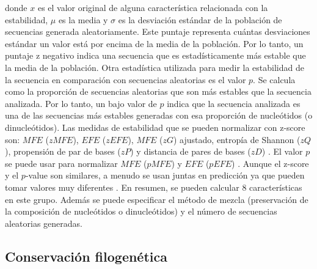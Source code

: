 \noindent donde $x$ es el valor original de alguna característica relacionada con la estabilidad, $\mu$ es la media y $\sigma$ es la desviación estándar de la
población de secuencias generada aleatoriamente. Este puntaje representa cuántas desviaciones estándar un valor está por encima de la media de la población. Por
lo tanto, un puntaje z negativo indica una secuencia que es estadísticamente más estable que la media de la población. Otra estadística utilizada para medir la
estabilidad de la secuencia en comparación con secuencias aleatorias es el valor $p$. Se calcula como la proporción de secuencias aleatorias que son más
estables que la secuencia analizada. Por lo tanto, un bajo valor de $p$ indica que la secuencia analizada es una de las secuencias más estables generadas con
esa proporción de nucleótidos (o dinucleótidos). Las medidas de estabilidad que se pueden normalizar con z-score son: $ MFE $ ($ zMFE $), $ EFE $ ($ zEFE $), $
MFE $ ($ zG $) ajustado, entropía de Shannon ($ zQ $), propensión de par de bases ($ zP $) \citep{ng2007novo} y distancia de pares de bases ($ zD $)
\citep{ding2010mirensvm}. El valor $p$ se puede usar para normalizar $ MFE $ ($ pMFE $) \citep{bonnet2004evidence} y $ EFE $ ($ pEFE $)
\citep{ding2010mirensvm}. Aunque el z-score y el $p$-value son similares, a menudo se usan juntas en predicción ya que pueden tomar valores muy diferentes
\citep{ding2010mirensvm}. En resumen, se pueden calcular 8 características en este grupo. Además se puede especificar el método de mezcla (preservación de la
composición de nucleótidos o dinucleótidos) y el número de secuencias aleatorias generadas.

\subsection{Conservación filogenética}

